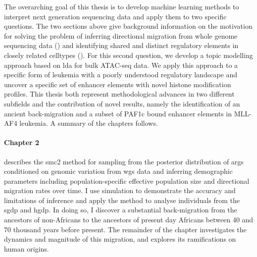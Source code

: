 The overarching goal of this thesis is to develop machine learning methods to interpret next generation sequencing data and apply them to two specific questions. The two sections above give background information on the motivation for solving the problem of inferring directional migration from whole genome sequencing data () and identifying shared and distinct regulatory elements in closely related celltypes (). For this second question, we develop a topic modelling approach based on \gls{lda} for bulk ATAC-seq data. We apply this approach to a specific form of leukemia with a poorly understood regulatory landscape and uncover a specific set of enhancer elements with novel histone modification profiles. This thesis both represent methodological advances in two different subfields and the contribution of novel results, namely the identification of an ancient back-migration and a subset of PAF1c bound enhancer elements in MLL-AF4 leukemia. A summary of the chapters follows.


\paragraph{Chapter 2} describes the \gls{smc2} method for sampling from the posterior distribution of \glspl{arg} conditioned on genomic variation from \gls{wgs} data and inferring demographic parameters including population-specific effective population size and directional migration rates over time. I use simulation to demonstrate the accuracy and limitations of inference and apply the method to analyse individuals from the \gls{sgdp} and \gls{hgdp}. In doing so, I discover a substantial back-migration from the ancestors of non-Africans to the ancestors of present day Africans between 40 and 70 thousand years before present. The remainder of the chapter investigates the dynamics and magnitude of this migration, and explores its ramifications on human origins.  

